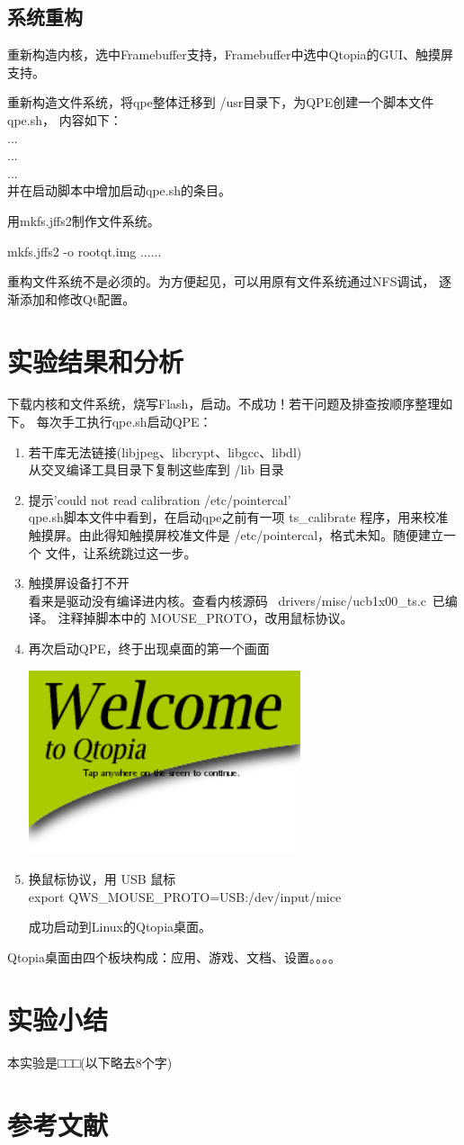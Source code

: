 \documentclass[nofonts]{ctexart}
\begin{document}
\subsection{系统重构}
	重新构造内核，选中Framebuffer支持，Framebuffer中选中Qtopia的GUI、触摸屏
支持。

	重新构造文件系统，将qpe整体迁移到 /usr目录下，为QPE创建一个脚本文件qpe.sh，
内容如下：\\
...\\ ...\\ ...\\

并在启动脚本中增加启动qpe.sh的条目。

	用mkfs.jffs2制作文件系统。

	mkfs.jffs2 -o rootqt.img ......

	重构文件系统不是必须的。为方便起见，可以用原有文件系统通过NFS调试，
逐渐添加和修改Qt配置。

\section{实验结果和分析}
	下载内核和文件系统，烧写Flash，启动。不成功！若干问题及排查按顺序整理如下。
每次手工执行qpe.sh启动QPE：
\begin{enumerate}
  \item 若干库无法链接(libjpeg、libcrypt、libgcc、libdl)\\
	从交叉编译工具目录下复制这些库到 /lib 目录
  \item 提示'could not read calibration /etc/pointercal'\\
	qpe.sh脚本文件中看到，在启动qpe之前有一项 ts\_calibrate 程序，用来校准
	触摸屏。由此得知触摸屏校准文件是 /etc/pointercal，格式未知。随便建立一个
	文件，让系统跳过这一步。
  \item 触摸屏设备打不开\\
	看来是驱动没有编译进内核。查看内核源码 ~drivers/misc/ucb1x00\_ts.c~已编译。
	注释掉脚本中的 MOUSE\_PROTO，改用鼠标协议。
  \item 再次启动QPE，终于出现桌面的第一个画面
\begin{center}
  \includegraphics[width=8cm]{First.png}\end{center}
  \item 换鼠标协议，用 USB 鼠标\\
	export QWS\_MOUSE\_PROTO=USB:/dev/input/mice
	
	成功启动到Linux的Qtopia桌面。
\end{enumerate}
	Qtopia桌面由四个板块构成：应用、游戏、文档、设置。。。。
\section{实验小结}本实验是□□□(以下略去8个字)\vskip 3cm
\section{参考文献}
\end{document}
